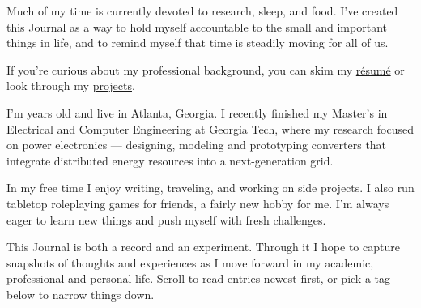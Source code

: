 


Much of my time is currently devoted to research, sleep, and food. I've created
this Journal as a way to hold myself accountable to the small and important
things in life, and to remind myself that time is steadily moving for all of us.


If you're curious about my professional background, you can skim my
\href{/resume.html}{résumé} or look through my
\href{/projects/projects_main.html}{projects}.

I'm \age{} years old and live in Atlanta, Georgia. I recently finished my
Master's in Electrical and Computer Engineering at Georgia Tech, where my
research focused on power electronics --- designing, modeling and prototyping
converters that integrate distributed energy resources into a next-generation
grid.

In my free time I enjoy writing, traveling, and working on side projects. I also
run tabletop roleplaying games for friends, a fairly new hobby for me. I'm always
eager to learn new things and push myself with fresh challenges.    

This Journal is both a record and an experiment. Through it I hope to capture
snapshots of thoughts and experiences as I move forward in my academic,
professional and personal life. Scroll to read entries newest-first, or pick a
tag below to narrow things down.


